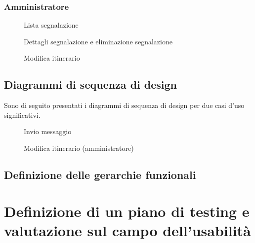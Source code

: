 \documentclass{natourDoc}
\begin{document}
\newpage

\subsubsection{Amministratore}
\begin{figure}[!htbp]
	\centering
	
	\caption{Lista segnalazione}
\end{figure}
\FloatBarrier

\begin{figure}[!htbp]
	\centering
	
	\caption{Dettagli segnalazione e eliminazione segnalazione}
\end{figure}
\FloatBarrier

\begin{figure}[!htbp]
	\centering
	
	\caption{Modifica itinerario}
\end{figure}
\FloatBarrier

\newpage
\subsection{Diagrammi di sequenza di design}
Sono di seguito presentati i diagrammi di sequenza di design per due casi d'uso significativi.

\begin{figure}[!htbp]
	\centering
	
	\caption{Invio messaggio}
\end{figure}
\FloatBarrier

\begin{figure}[!htbp]
	\centering
	
	\caption{Modifica itinerario (amministratore)}
\end{figure}
\FloatBarrier

\newpage
\subsection{Definizione delle gerarchie funzionali}

\newpage
\section{Definizione di un piano di testing e valutazione sul campo dell'usabilità}
\end{document}
